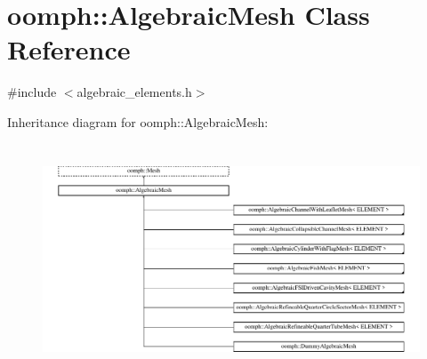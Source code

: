 \hypertarget{classoomph_1_1AlgebraicMesh}{}\section{oomph\+:\+:Algebraic\+Mesh Class Reference}
\label{classoomph_1_1AlgebraicMesh}


{\ttfamily \#include $<$algebraic\+\_\+elements.\+h$>$}

Inheritance diagram for oomph\+:\+:Algebraic\+Mesh\+:\begin{figure}[H]
\begin{center}
\leavevmode
\includegraphics[height=6.896552cm]{classoomph_1_1AlgebraicMesh}
\end{center}
\end{figure}
